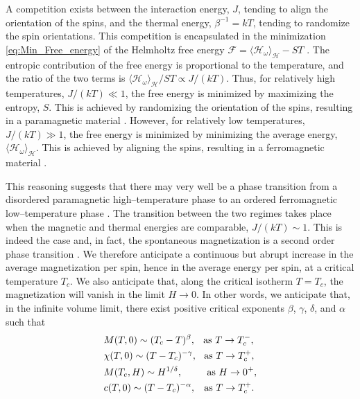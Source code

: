 \documentclass[english,12pt]{ttuthes}
\newcommand{\Hc}{\mathcal{H}}
\newcommand{\Fc}{\mathcal{F}}
\begin{document}
A competition exists between the interaction energy, $J$, tending to 
align the orientation of the spins, and the thermal energy,
$\beta^{-1}=kT$, tending to randomize the spin orientations. This 
competition is encapsulated in the minimization
\eqref{eq:Min_Free_energy} of the Helmholtz free energy
$\Fc=\langle\Hc_\omega\rangle_{\Hc}-ST$ \cite{Christensen-2005}. The entropic
contribution of the free energy is proportional to the temperature, and
the ratio of the two terms is
$\langle\Hc_\omega\rangle_{\Hc}/ST\propto J/(kT)$. Thus, for relatively high
temperatures, $J/(kT)\ll1$, the free energy is minimized by maximizing the
entropy, $S$. This is achieved by randomizing the orientation of the
spins, resulting in a paramagnetic material
\cite{Christensen-2005}. However, for relatively low temperatures,
$J/(kT)\gg1$, the free energy is minimized by minimizing the average
energy, $\langle\Hc_\omega\rangle_{\Hc}$. This is achieved by aligning
the spins, resulting in a ferromagnetic material
\cite{Christensen-2005}.  

This reasoning suggests that there may very well be a phase transition
from a disordered paramagnetic high--temperature phase to an ordered
ferromagnetic low--temperature phase \cite{Christensen-2005}. The
transition between the two regimes takes place when the magnetic and
thermal energies are comparable, $J/(kT)\sim1$. This is indeed the case
and, in fact, the spontaneous magnetization is a second order phase
transition \cite{Ruelle-1969,Firas,Robertson-1993,Christensen-2005}. We  
therefore anticipate a continuous but abrupt increase in the average 
magnetization per spin, hence in the average energy per spin, at a
critical temperature $T_c$. We also anticipate that, along the
critical isotherm $T=T_c$, the magnetization will vanish in the limit
$H\to0$. In other words, we anticipate that, in the infinite volume
limit, there exist positive critical exponents $\beta$, $\gamma$, $\delta$, and
$\alpha$ such that \cite{Christensen-2005,Baker-1990} 
%
\begin{align}\label{eq:Ising_Crit_Exponents}
  &M(T,0)\sim(T_c-T)^\beta, \hspace{0.11in} \text{as  }  T\to T_c^-,\\
  &\chi(T,0)\sim(T-T_c)^{-\gamma},  \hspace{0.1in} \text{as  }  T\to T_c^+, \notag\\
  &M(T_c,H)\sim H^{1/ \delta }, \hspace{0.35in} \text{as  }  H \to 0^+,\notag\\
  &c(T,0)\sim(T-T_c)^{-\alpha}, \hspace{0.12in} \text{as  }  T\to T_c^+.\notag
\end{align}
%
\end{document}
